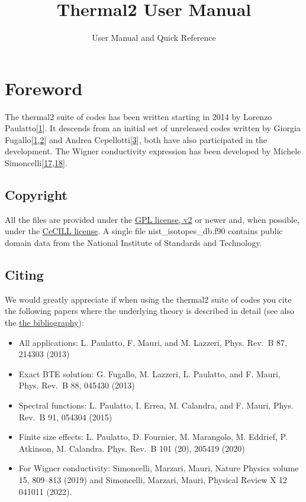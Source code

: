 \documentclass[
]{article}
\title{Thermal2 User Manual}
\subtitle{User Manual and Quick Reference}
\author{}
\date{}
\providecommand{\tightlist}{%
  \setlength{\itemsep}{0pt}\setlength{\parskip}{0pt}}
\begin{document}
\begin{titlepage}

\end{titlepage}

{
\setcounter{tocdepth}{3}
\tableofcontents
}
\hypertarget{foreword}{%
\section{Foreword}\label{foreword}}

The thermal2 suite of codes has been written starting in 2014 by Lorenzo
Paulatto{[}\protect\hyperlink{ref1}{1}{]}. It descends from an initial
set of unreleased codes written by Giorgia
Fugallo{[}\protect\hyperlink{ref1}{1},\protect\hyperlink{ref2}{2}{]} and
Andrea Cepellotti{[}\protect\hyperlink{ref3}{3}{]}, both have also
participated in the development. The Wigner conductivity expression has
been developed by Michele
Simoncelli{[}\protect\hyperlink{ref17}{17},\protect\hyperlink{ref18}{18}{]}.

\hypertarget{copyright}{%
\subsection{Copyright}\label{copyright}}

All the files are provided under the
\href{https://www.gnu.org/licenses/old-licenses/gpl-2.0.en.html}{GPL
license, v2} or newer and, when possible, under the
\href{https://cecill.info/licences/Licence_CeCILL_V2.1-fr.html}{CeCILL
license}. A single file nist\_isotopes\_db.f90 contains public domain
data from the National Institute of Standards and Technology.

\hypertarget{citing}{%
\subsection{Citing}\label{citing}}

We would greatly appreciate if when using the thermal2 suite of codes
you cite the following papers where the underlying theory is described
in detail (see also the \protect\hyperlink{Bibliography}{the
bibliography}):

\begin{itemize}
\tightlist
\item
  All applications: L. Paulatto, F. Mauri, and M. Lazzeri, Phys. Rev.~B
  87, 214303 (2013)
\item
  Exact BTE solution: G. Fugallo, M. Lazzeri, L. Paulatto, and F. Mauri,
  Phys. Rev.~B 88, 045430 (2013)
\item
  Spectral functions: L. Paulatto, I. Errea, M. Calandra, and F. Mauri,
  Phys. Rev.~B 91, 054304 (2015)
\item
  Finite size effects: L. Paulatto, D. Fournier, M. Marangolo, M.
  Eddrief, P. Atkinson, M. Calandra. Phys. Rev.~B 101 (20), 205419
  (2020)
\item
  For Wigner conductivity: Simoncelli, Marzari, Mauri, Nature Physics
  volume 15, 809--813 (2019) and Simoncelli, Marzari, Mauri, Physical
  Review X 12 041011 (2022).
\end{itemize}
\end{document}
